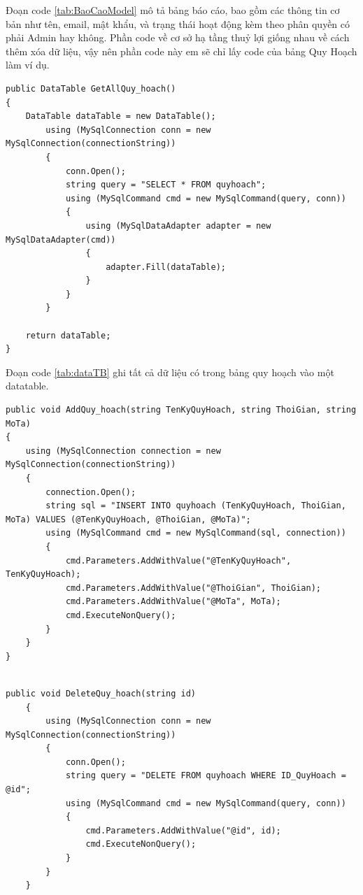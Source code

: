 \documentclass{article} %
\begin{document}
Đoạn code \ref{tab:BaoCaoModel} mô tả bảng báo cáo, bao gồm các thông tin cơ bản như tên, email, mật khẩu, và trạng thái hoạt động kèm theo phân quyền có phải Admin hay không.
\newpage
Phần code về cơ sở hạ tầng thuỷ lợi giống nhau về cách thêm xóa dữ liệu, vậy nên phần code này em sẽ chỉ lấy code của bảng Quy Hoạch làm ví dụ.

\begin{lstlisting}[caption={Lấy tất cả dữ liệu trong database}, label={tab:dataTB}]   
public DataTable GetAllQuy_hoach()
{
    DataTable dataTable = new DataTable();
        using (MySqlConnection conn = new MySqlConnection(connectionString))
        {
            conn.Open();
            string query = "SELECT * FROM quyhoach";
            using (MySqlCommand cmd = new MySqlCommand(query, conn))
            {
                using (MySqlDataAdapter adapter = new MySqlDataAdapter(cmd))
                {
                    adapter.Fill(dataTable);
                }
            }
        }

    return dataTable;
}
\end{lstlisting}

Đoạn code \ref{tab:dataTB} ghi tất cả dữ liệu có trong bảng quy hoạch vào một datatable.

\begin{lstlisting}[caption={Thêm dữ liệu trong database}, label={tab:add}]   
 public void AddQuy_hoach(string TenKyQuyHoach, string ThoiGian, string MoTa)
{
    using (MySqlConnection connection = new MySqlConnection(connectionString))
    {
        connection.Open();
        string sql = "INSERT INTO quyhoach (TenKyQuyHoach, ThoiGian, MoTa) VALUES (@TenKyQuyHoach, @ThoiGian, @MoTa)";
        using (MySqlCommand cmd = new MySqlCommand(sql, connection))
        {
            cmd.Parameters.AddWithValue("@TenKyQuyHoach", TenKyQuyHoach);
            cmd.Parameters.AddWithValue("@ThoiGian", ThoiGian);
            cmd.Parameters.AddWithValue("@MoTa", MoTa);
            cmd.ExecuteNonQuery();
        }
    }
}
    
\end{lstlisting}


\begin{lstlisting}[caption={Xóa một dữ liệu trong database}, label={tab:xoaxoa}]   
    public void DeleteQuy_hoach(string id)
    {
        using (MySqlConnection conn = new MySqlConnection(connectionString))
        {
            conn.Open();
            string query = "DELETE FROM quyhoach WHERE ID_QuyHoach = @id";
            using (MySqlCommand cmd = new MySqlCommand(query, conn))
            {
                cmd.Parameters.AddWithValue("@id", id);
                cmd.ExecuteNonQuery();
            }
        }
    }
\end{lstlisting}
   
\end{document}
